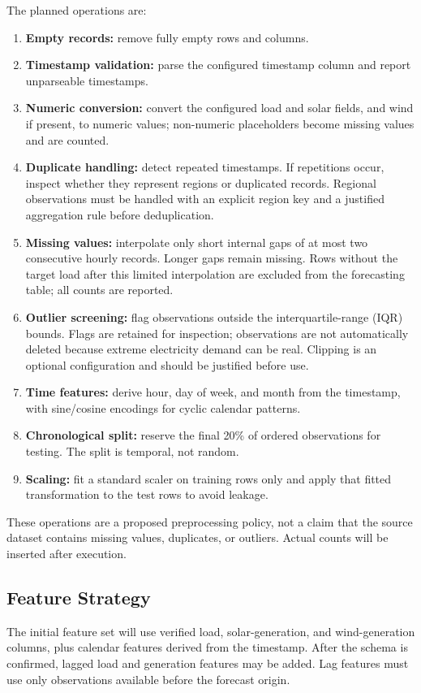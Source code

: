 \documentclass[12pt,a4paper]{article}
\begin{document}
The planned operations are:
\begin{enumerate}[leftmargin=*]
  \item \textbf{Empty records:} remove fully empty rows and columns.
  \item \textbf{Timestamp validation:} parse the configured timestamp column and report unparseable timestamps.
  \item \textbf{Numeric conversion:} convert the configured load and solar fields, and wind if present, to numeric values; non-numeric placeholders become missing values and are counted.
  \item \textbf{Duplicate handling:} detect repeated timestamps. If repetitions occur, inspect whether they represent regions or duplicated records. Regional observations must be handled with an explicit region key and a justified aggregation rule before deduplication.
  \item \textbf{Missing values:} interpolate only short internal gaps of at most two consecutive hourly records. Longer gaps remain missing. Rows without the target load after this limited interpolation are excluded from the forecasting table; all counts are reported.
  \item \textbf{Outlier screening:} flag observations outside the interquartile-range (IQR) bounds. Flags are retained for inspection; observations are not automatically deleted because extreme electricity demand can be real. Clipping is an optional configuration and should be justified before use.
  \item \textbf{Time features:} derive hour, day of week, and month from the timestamp, with sine/cosine encodings for cyclic calendar patterns.
  \item \textbf{Chronological split:} reserve the final 20\% of ordered observations for testing. The split is temporal, not random.
  \item \textbf{Scaling:} fit a standard scaler on training rows only and apply that fitted transformation to the test rows to avoid leakage.
\end{enumerate}

These operations are a proposed preprocessing policy, not a claim that the source dataset contains missing values, duplicates, or outliers. Actual counts will be inserted after execution.

\subsection{Feature Strategy}
The initial feature set will use verified load, solar-generation, and wind-generation columns, plus calendar features derived from the timestamp. After the schema is confirmed, lagged load and generation features may be added. Lag features must use only observations available before the forecast origin.
\end{document}

